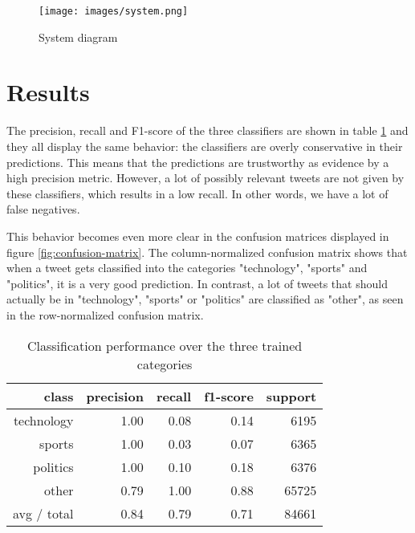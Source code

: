\documentclass{llncs}
\begin{document}
\begin{figure}[H]
  \centering
  \texttt{[image: images/system.png]}
  \caption{System diagram}
  \label{fig:System diagram}
\end{figure}

\section{Results}

The precision, recall and F1-score of the three classifiers are shown in table \ref{tbl:classification-report} and they all display the same behavior: the classifiers are overly conservative in their predictions. This means that the predictions are trustworthy as evidence by a high precision metric. However, a lot of possibly relevant tweets are not given by these classifiers, which results in a low recall. In other words, we have a lot of false negatives. 

This behavior becomes even more clear in the confusion matrices displayed in figure \ref{fig:confusion-matrix}. The column-normalized confusion matrix shows that when a tweet gets classified into the categories "technology", "sports" and "politics", it is a very good prediction. In contrast, a lot of tweets that should actually be in "technology", "sports" or "politics" are classified as "other", as seen in the row-normalized confusion matrix.

\begin{table}
\begin{center}
\begin{tabular}{|r|r|r|r|r|} \hline
class  & precision   & recall & f1-score  & support \\ \hline
 technology    &   1.00 &     0.08  &    0.14   &   6195 \\
     sports   &    1.00   &   0.03   &   0.07   &   6365 \\
   politics   &    1.00  &    0.10   &   0.18   &   6376 \\
      other   &    0.79 &     1.00  &    0.88   &  65725 \\ \hline
avg / total  &     0.84   &   0.79  &    0.71   &  84661 \\ \hline
\end{tabular}
\end{center}
\caption{Classification performance over the three trained categories}
\label{tbl:classification-report}
\end{table}
 
\end{document}
